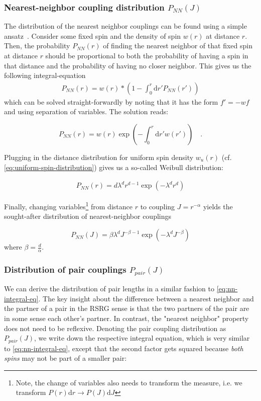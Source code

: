 \subsubsection{Nearest-neighbor coupling distribution $P_{NN}(J)$}

The distribution of the nearest neighbor couplings can be found using a simple ansatz~\cite{chandrasekharStochasticProblemsPhysics1943}. Consider some fixed spin and the density of spin $w(r)$ at distance $r$. Then, the probability $P_{NN}(r)$ of finding the nearest neighbor of that fixed spin at distance $r$ should be proportional to both the probability of having a spin in that distance and the probability of having no closer neighbor. This gives us the following integral-equation 
\begin{align}\label{eq:nn-integral-eq}
	P_{NN}(r) = w(r)*\left(1-\int_0^r \mathrm{d}r' P_{NN}(r')\right)
\end{align}
which can be solved straight-forwardly by noting that it has the form $f' = -w f$ and using separation of variables. The solution reads:

\begin{equation}\label{eq:nn-distribution}
	P_{NN}(r) = w(r)\exp\left(-\int_0^r \!\mathrm{d}r' w(r')\right)\quad.
\end{equation}

Plugging in the distance distribution for uniform spin density $w_u(r)$ (cf. \autoref{eq:uniform-spin-distribution}) gives us a so-called Weibull distribution:

\begin{align}\label{eq:weibull-distribution}
	P_{NN}(r) = d \lambda^d r^{d-1} \exp(- \lambda^d r^d)
\end{align}

Finally, changing variables\footnote{Note, the change of variables also needs to transform the measure, i.e. we transform $P(r)\mathrm{d}r \!\rightarrow\! P(J)\mathrm{d}J$} from distance $r$ to coupling $J=r^{-\alpha}$ yields the sought-after distribution of nearest-neighbor couplings

\begin{equation}\label{eq:P-NN-J}
	P_{NN}(J) = \beta\lambda^d J^{-\beta-1} \exp\left(-\lambda^d J^{-\beta}\right)
\end{equation}
where $\beta=\frac{d}{\alpha}$.

\subsubsection{Distribution of pair couplings $P_{pair}(J)$}
We can derive the distribution of pair lengths in a similar fashion to \autoref{eq:nn-integral-eq}. The key insight about the difference between a nearest neighbor and the partner of a pair in the RSRG sense is that the two partners of the pair are in some sense each other's partner. In contrast, the "nearest neighbor" property does not need to be reflexive. Denoting the pair coupling distribution as $P_{pair}(J)$, we write down the respective integral equation, which is very similar to \autoref{eq:nn-integral-eq}, except that the second factor gets squared because \emph{both spins} may not be part of a smaller pair:

